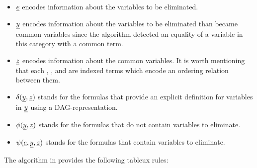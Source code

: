 \begin{itemize}
  \item $\underline{e}$ encodes information about 
    the variables to be eliminated.
  \item $\underline{y}$ encodes information about 
    the variables to be eliminated
    than became common variables since the 
    algorithm detected an equality
    of a variable in this category with a common term.
  \item $\underline{z}$ encodes information about the 
    common variables. It is worth
    mentioning that each , , and  
    are indexed terms
    which encode an ordering relation between them.
  \item $\delta(\underline{y}, \underline{z})$ stands for the formulas 
    that provide
    an explicit definition for variables in 
    $\underline{y}$ using a DAG-representation.
  \item $\phi(\underline{y}, \underline{z})$ stands for the formulas 
    that do not contain
    variables to eliminate.
  \item $\psi(\underline{e}, \underline{y}, \underline{z})$ stands 
    for the formulas
    that contain variables to eliminate.
\end{itemize}

The algorithm in \cite{ghilardi2020compactly} provides 
the following tableux rules:

